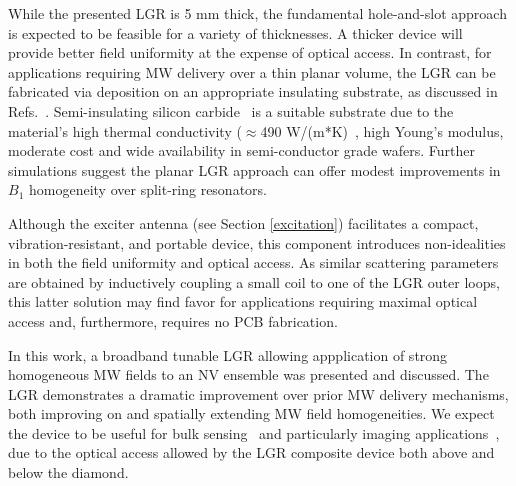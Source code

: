 While the presented LGR is 5 mm thick, the fundamental hole-and-slot approach is expected to be feasible for a variety of thicknesses. A thicker device will provide better field uniformity at the expense of optical access. In contrast, for applications requiring MW delivery over a thin planar volume, the LGR can be fabricated via deposition on an appropriate insulating substrate, as discussed in Refs.~\cite{twig2013ultra,twig2010sensitive}. Semi-insulating silicon carbide~\cite{schloss2018simultaneous} is a suitable substrate due to the material's high thermal conductivity ($\approx$490 W/(m*K)~\cite{protik2017phonon,qian2017anisotropic}, high Young's modulus, moderate cost and wide availability in semi-conductor grade wafers. Further simulations suggest the planar LGR approach can offer modest improvements in $B_1$ homogeneity over split-ring resonators. 

Although the exciter antenna (see Section \ref{excitation}) facilitates a compact, vibration-resistant, and portable device, this component introduces non-idealities in both the field uniformity and optical access. As similar scattering parameters are obtained by inductively coupling a small coil to one of the LGR outer loops, this latter solution may find favor for applications requiring maximal optical access and, furthermore, requires no PCB fabrication.

In this work, a broadband tunable LGR allowing appplication of strong homogeneous MW fields to an NV ensemble was presented and discussed. The LGR demonstrates a dramatic improvement over prior MW delivery mechanisms, both improving on and spatially extending MW field homogeneities. We expect the device to be useful for bulk sensing~\cite{acosta2009diamonds,wolf2015subpicotesla,clevenson2015broadband,chatzidrosos2017miniature,barry2016optical} and particularly imaging applications~\cite{karaveli2016modulation,glenn2015single,barry2016optical,lesage2013optical,wu2016diamond,fu2014solar,glenn2017micrometer}, due to the optical access allowed by the LGR composite device both above and below the diamond.




